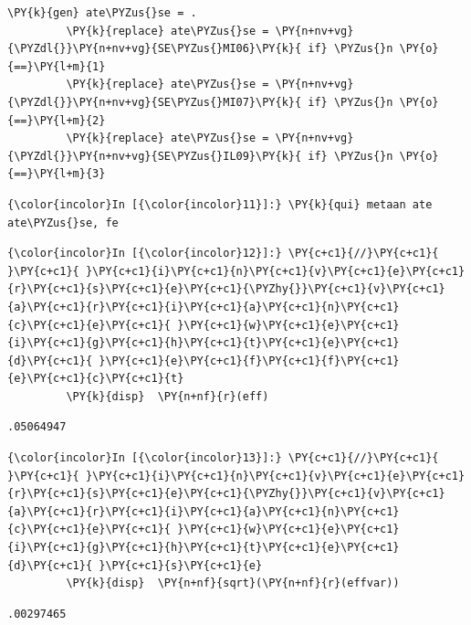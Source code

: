 \documentclass[11pt,notitlepage]{article}\usepackage[]{graphicx}\usepackage[]{color}
\makeatletter
\newenvironment{kframe}{%
 \def\at@end@of@kframe{}%
 \ifinner\ifhmode%
  \def\at@end@of@kframe{\end{minipage}}%
  \begin{minipage}{\columnwidth}%
 \fi\fi%
 \def\FrameCommand##1{\hskip\@totalleftmargin \hskip-\fboxsep
 \colorbox{shadecolor}{##1}\hskip-\fboxsep
     \hskip-\linewidth \hskip-\@totalleftmargin \hskip\columnwidth}%
 \MakeFramed {\advance\hsize-\width
   \@totalleftmargin\z@ \linewidth\hsize
   \@setminipage}}%
 {\par\unskip\endMakeFramed%
 \at@end@of@kframe}
\newenvironment{knitrout}{}{} %
\makeatother
\begin{document}
\begin{enumerate}[a)]
\begin{knitrout}
\begin{kframe}
\begin{Verbatim}[commandchars=\\\{\}]
         \PY{k}{gen} ate\PYZus{}se = .
         \PY{k}{replace} ate\PYZus{}se = \PY{n+nv+vg}{\PYZdl{}}\PY{n+nv+vg}{SE\PYZus{}MI06}\PY{k}{ if} \PYZus{}n \PY{o}{==}\PY{l+m}{1}
         \PY{k}{replace} ate\PYZus{}se = \PY{n+nv+vg}{\PYZdl{}}\PY{n+nv+vg}{SE\PYZus{}MI07}\PY{k}{ if} \PYZus{}n \PY{o}{==}\PY{l+m}{2}
         \PY{k}{replace} ate\PYZus{}se = \PY{n+nv+vg}{\PYZdl{}}\PY{n+nv+vg}{SE\PYZus{}IL09}\PY{k}{ if} \PYZus{}n \PY{o}{==}\PY{l+m}{3}
\end{Verbatim}

    \begin{Verbatim}[commandchars=\\\{\}]
{\color{incolor}In [{\color{incolor}11}]:} \PY{k}{qui} metaan ate ate\PYZus{}se, fe
\end{Verbatim}

    \begin{Verbatim}[commandchars=\\\{\}]
{\color{incolor}In [{\color{incolor}12}]:} \PY{c+c1}{//}\PY{c+c1}{ }\PY{c+c1}{ }\PY{c+c1}{i}\PY{c+c1}{n}\PY{c+c1}{v}\PY{c+c1}{e}\PY{c+c1}{r}\PY{c+c1}{s}\PY{c+c1}{e}\PY{c+c1}{\PYZhy{}}\PY{c+c1}{v}\PY{c+c1}{a}\PY{c+c1}{r}\PY{c+c1}{i}\PY{c+c1}{a}\PY{c+c1}{n}\PY{c+c1}{c}\PY{c+c1}{e}\PY{c+c1}{ }\PY{c+c1}{w}\PY{c+c1}{e}\PY{c+c1}{i}\PY{c+c1}{g}\PY{c+c1}{h}\PY{c+c1}{t}\PY{c+c1}{e}\PY{c+c1}{d}\PY{c+c1}{ }\PY{c+c1}{e}\PY{c+c1}{f}\PY{c+c1}{f}\PY{c+c1}{e}\PY{c+c1}{c}\PY{c+c1}{t}
         \PY{k}{disp}  \PY{n+nf}{r}(eff)
\end{Verbatim}

    \begin{Verbatim}[commandchars=\\\{\}]
.05064947

    \end{Verbatim}

    \begin{Verbatim}[commandchars=\\\{\}]
{\color{incolor}In [{\color{incolor}13}]:} \PY{c+c1}{//}\PY{c+c1}{ }\PY{c+c1}{ }\PY{c+c1}{i}\PY{c+c1}{n}\PY{c+c1}{v}\PY{c+c1}{e}\PY{c+c1}{r}\PY{c+c1}{s}\PY{c+c1}{e}\PY{c+c1}{\PYZhy{}}\PY{c+c1}{v}\PY{c+c1}{a}\PY{c+c1}{r}\PY{c+c1}{i}\PY{c+c1}{a}\PY{c+c1}{n}\PY{c+c1}{c}\PY{c+c1}{e}\PY{c+c1}{ }\PY{c+c1}{w}\PY{c+c1}{e}\PY{c+c1}{i}\PY{c+c1}{g}\PY{c+c1}{h}\PY{c+c1}{t}\PY{c+c1}{e}\PY{c+c1}{d}\PY{c+c1}{ }\PY{c+c1}{s}\PY{c+c1}{e}
         \PY{k}{disp}  \PY{n+nf}{sqrt}(\PY{n+nf}{r}(effvar))
\end{Verbatim}

    \begin{Verbatim}[commandchars=\\\{\}]
.00297465


\end{Verbatim}
\end{kframe}
\end{knitrout}
\end{enumerate}
\end{document}
